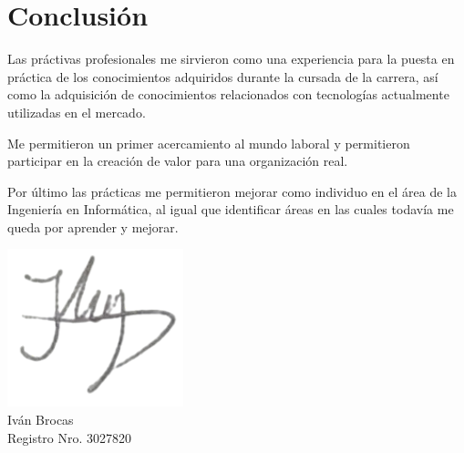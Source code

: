\section{Conclusión}
Las práctivas profesionales me sirvieron como una experiencia para la puesta en práctica de los conocimientos adquiridos durante la cursada de la carrera, así como la adquisición de conocimientos relacionados con tecnologías actualmente utilizadas en el mercado. 

Me permitieron un primer acercamiento al mundo laboral y permitieron participar en la creación de valor para una organización real.

Por último las prácticas me permitieron mejorar como individuo en el área de la Ingeniería en Informática, al igual que identificar áreas en las cuales todavía me queda por aprender y mejorar.

{\centering
    \includegraphics[scale=0.41]{images/firma.png}\\
    Iván Brocas\\
    Registro Nro. 3027820\\
}